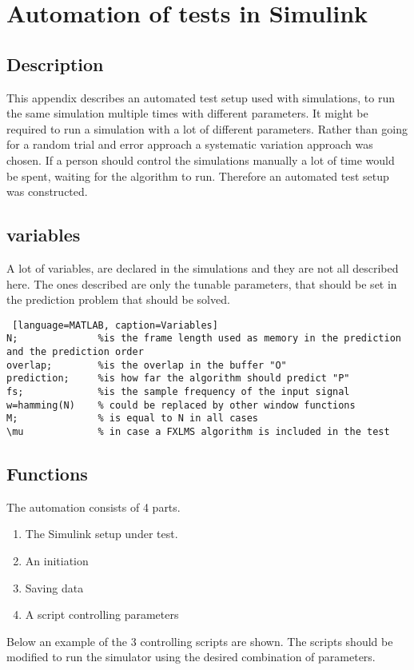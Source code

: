 \section{Automation of tests in Simulink} \label{sec:SimulinkAuto}
\subsection{Description}
This appendix describes an automated test setup used with simulations, to run the same simulation multiple times with different parameters.
It might be required to run a simulation with a lot of different parameters. Rather than going for a random trial and error approach a systematic variation approach was chosen. If a person should control the simulations manually a lot of time would be spent, waiting for the algorithm to run. Therefore an automated test setup was constructed. 

\subsection{variables}
A lot of variables, are declared in the simulations and they are not all described here. The ones described are only the tunable parameters, that should be set in the prediction problem that should be solved. 
\begin{lstlisting} [language=MATLAB, caption=Variables]
N; 				%is the frame length used as memory in the prediction and the prediction order
overlap;		%is the overlap in the buffer "O"
prediction; 	%is how far the algorithm should predict "P"
fs; 			%is the sample frequency of the input signal 
w=hamming(N)	% could be replaced by other window functions
M;				% is equal to N in all cases
\mu 			% in case a FXLMS algorithm is included in the test
\end{lstlisting}

\subsection{Functions}
 The automation consists of 4 parts. 
\begin{enumerate}
	\item The Simulink setup under test. 
	\item An initiation 
	\item Saving data
	\item A script controlling parameters 
\end{enumerate}  

Below an example of the 3 controlling scripts are shown. The  scripts should be modified to run the simulator using the desired combination of parameters.

